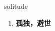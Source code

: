
\begin{frame}
{\huge solitude}
\begin{center}
\begin{enumerate}\Large
  \item \textbf{孤独，避世}
\end{enumerate}
\end{center}
\end{frame}
